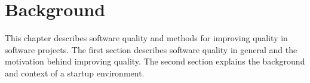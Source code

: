 
 \chapter{Background}
 
This chapter describes software quality and methods for improving quality in software projects. The first section describes software quality in general and the motivation behind improving quality. The second section explains the background and context of a startup environment.

 


